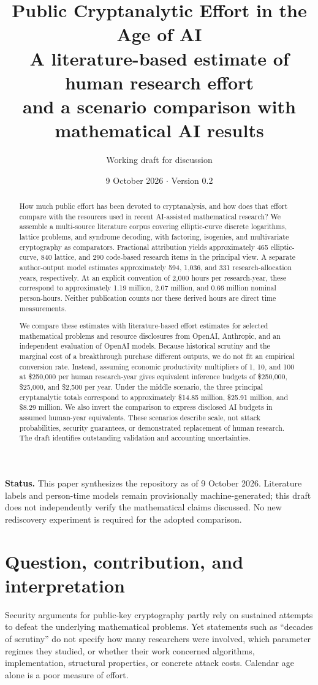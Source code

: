 \documentclass[11pt,letterpaper]{article}
\title{\textbf{Public Cryptanalytic Effort in the Age of AI}\\[5pt]
\large A literature-based estimate of human research effort\\and a scenario comparison with mathematical AI results}
\author{Working draft for discussion}
\date{9 October 2026 \quad $\cdot$ \quad Version 0.2}
\begin{document}
\maketitle
\thispagestyle{empty}
\begin{abstract}
How much public effort has been devoted to cryptanalysis, and how does that effort compare with the resources used in recent AI-assisted mathematical research? We assemble a multi-source literature corpus covering elliptic-curve discrete logarithms, lattice problems, and syndrome decoding, with factoring, isogenies, and multivariate cryptography as comparators. Fractional attribution yields approximately 465 elliptic-curve, 840 lattice, and 290 code-based research items in the principal view. A separate author-output model estimates approximately 594, 1,036, and 331 research-allocation years, respectively. At an explicit convention of 2,000 hours per research-year, these correspond to approximately 1.19 million, 2.07 million, and 0.66 million nominal person-hours. Neither publication counts nor these derived hours are direct time measurements.

We compare these estimates with literature-based effort estimates for selected mathematical problems and resource disclosures from OpenAI, Anthropic, and an independent evaluation of OpenAI models. Because historical scrutiny and the marginal cost of a breakthrough purchase different outputs, we do not fit an empirical conversion rate. Instead, assuming economic productivity multipliers of 1, 10, and 100 at \$250,000 per human research-year gives equivalent inference budgets of \$250,000, \$25,000, and \$2,500 per year. Under the middle scenario, the three principal cryptanalytic totals correspond to approximately \$14.85 million, \$25.91 million, and \$8.29 million. We also invert the comparison to express disclosed AI budgets in assumed human-year equivalents. These scenarios describe scale, not attack probabilities, security guarantees, or demonstrated replacement of human research. The draft identifies outstanding validation and accounting uncertainties.
\end{abstract}
\vspace{4pt}
{\small\textbf{Status.} This paper synthesizes the repository as of 9 October 2026. Literature labels and person-time models remain provisionally machine-generated; this draft does not independently verify the mathematical claims discussed. No new rediscovery experiment is required for the adopted comparison.}
\newpage

\section{Question, contribution, and interpretation}
Security arguments for public-key cryptography partly rely on sustained attempts to defeat the underlying mathematical problems. Yet statements such as ``decades of scrutiny'' do not specify how many researchers were involved, which parameter regimes they studied, or whether their work concerned algorithms, implementation, structural properties, or concrete attack costs. Calendar age alone is a poor measure of effort.
\end{document}
